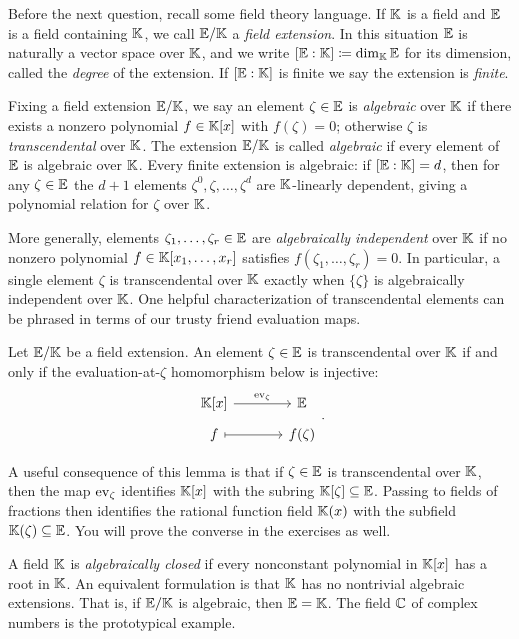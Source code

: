 \documentclass[Notebook.tex]{subfiles}
\begin{document}
Before the next question, recall some field theory language. If $\mathbb K$ is a field and $\mathbb E$ is a field containing $\mathbb K$, we call $\mathbb E/\mathbb K$ a \emph{field extension}. In this situation $\mathbb E$ is naturally a vector space over $\mathbb K$, and we write $[\mathbb E:\mathbb K]\coloneqq \dim_\mathbb K \mathbb E$ for its dimension, called the \emph{degree} of the extension. If $[\mathbb E:\mathbb K]$ is finite we say the extension is \emph{finite}. 

Fixing a field extension $\mathbb E/\mathbb K$, we say an element $\zeta \in \mathbb E$ is \emph{algebraic} over $\mathbb K$ if there exists a nonzero polynomial $f\in \mathbb K[x]$ with $f(\zeta)=0$; otherwise $\zeta$ is \emph{transcendental} over $\mathbb K$. The extension $\mathbb E/\mathbb K$ is called \emph{algebraic} if every element of $\mathbb E$ is algebraic over $\mathbb K$. Every finite extension is algebraic: if $[\mathbb E:\mathbb K]=d$, then for any $\zeta \in \mathbb E$ the $d+1$ elements $\zeta^{0}, \zeta,\ldots, \zeta^d$ are $\mathbb K$-linearly dependent, giving a polynomial relation for $\zeta$ over $\mathbb K$.

More generally, elements $\zeta_1,\ldots,\zeta_r\in \mathbb E$ are \emph{algebraically independent} over $\mathbb K$ if no nonzero polynomial $f\in \mathbb K[x_1,\ldots,x_r]$ satisfies $f(\zeta_1,\ldots,\zeta_r)=0$. In particular, a single element $\zeta$ is transcendental over $\mathbb K$ exactly when $\{\zeta\}$ is algebraically independent over $\mathbb K$. One helpful characterization of transcendental elements can be phrased in terms of our trusty friend evaluation maps. 

\begin{lemma}
Let $\mathbb E/\mathbb K$ be a field extension. An element $\zeta \in \mathbb E$ is transcendental over $\mathbb K$ if and only if the evaluation-at-$\zeta$ homomorphism below is injective:
\[
\begin{tikzcd}[row sep = .5em, column sep = 3.5em]
\K[x] \arrow[r, "\ev_{\zeta}"] & \E \\
f \arrow[r,mapsto] &  f(\zeta)
\end{tikzcd}.
\]
\end{lemma}
A useful consequence of this lemma is that if $\zeta\in \mathbb E$ is transcendental over $\mathbb K$, then the map $\operatorname{ev}_\zeta$ identifies $\mathbb K[x]$ with the subring $\mathbb K[\zeta]\subseteq \mathbb E$. Passing to fields of fractions then identifies the rational function field $\mathbb K(x)$ with the subfield $\mathbb K(\zeta)\subseteq \mathbb E$. You will prove the converse in the exercises as well.

A field  $\mathbb K$ is \emph{algebraically closed} if every nonconstant polynomial in $\mathbb K[x]$ has a root in $\mathbb K$. An equivalent formulation is that  $\mathbb K$ has no nontrivial algebraic extensions. That is, if $\mathbb E/\mathbb K$ is algebraic, then $\mathbb E=\mathbb K$. The field $\mathbb C$ of complex numbers is the prototypical example.
\end{document}
